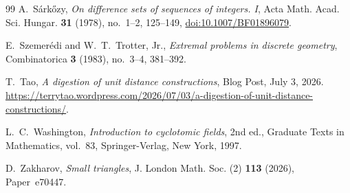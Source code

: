 \documentclass[11pt,reqno]{amsart}
\theoremstyle{definition}
\theoremstyle{remark}
\begin{document}
\begin{thebibliography}{99}
A.~S\'ark\H{o}zy,
\emph{On difference sets of sequences of integers. I},
Acta Math. Acad. Sci. Hungar. \textbf{31} (1978), no.~1--2, 125--149,
\href{https://doi.org/10.1007/BF01896079}{doi:10.1007/BF01896079}.

E.~Szemer\'edi and W.~T.~Trotter, Jr.,
\emph{Extremal problems in discrete geometry},
Combinatorica \textbf{3} (1983), no.~3--4, 381--392.

T.~Tao, {\em A digestion of unit distance constructions}, Blog Post, July 3, 2026.
\newblock
\url{https://terrytao.wordpress.com/2026/07/03/a-digestion-of-unit-distance-constructions/}.

L.~C.~Washington,
\emph{Introduction to cyclotomic fields},
2nd ed., Graduate Texts in Mathematics, vol.~83,
Springer-Verlag, New York, 1997.

D.~Zakharov, \emph{Small triangles}, J. London Math. Soc. (2) \textbf{113} (2026), Paper~e70447. 

\end{thebibliography}
\end{document}
